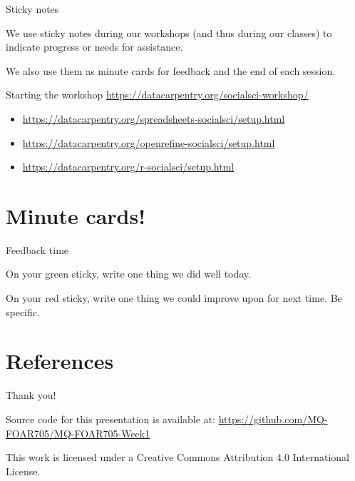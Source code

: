 \documentclass[aspectratio=169, 11pt]{beamer} %
\begin{document}
\begin{frame}{Sticky notes}

We use sticky notes during our workshops (and thus during our classes) to indicate progress or needs for assistance. 

We also use them as minute cards for feedback and the end of each session. 

\end{frame}
\begin{frame}{Starting the workshop}
    \url{https://datacarpentry.org/socialsci-workshop/}
    \begin{itemize}
        \item \url{https://datacarpentry.org/spreadsheets-socialsci/setup.html}
        \item \url{https://datacarpentry.org/openrefine-socialsci/setup.html}
        \item \url{https://datacarpentry.org/r-socialsci/setup.html}
    \end{itemize}
\end{frame}


% 



\section{Minute cards!}
\begin{frame}{Feedback time}

On your green sticky, write one thing we did well today.

On your red sticky, write one thing we could improve upon for next time. Be specific. 

\end{frame}

\section{References}

\begin{multicols}{2}[]


\end{multicols}


  
%   
%   


\begin{frame}{Thank you!}


Source code for this presentation is available at: \url{https://github.com/MQ-FOAR705/MQ-FOAR705-Week1}

This work is licensed under a Creative Commons Attribution 4.0 International License.

\end{frame}
\end{document}
